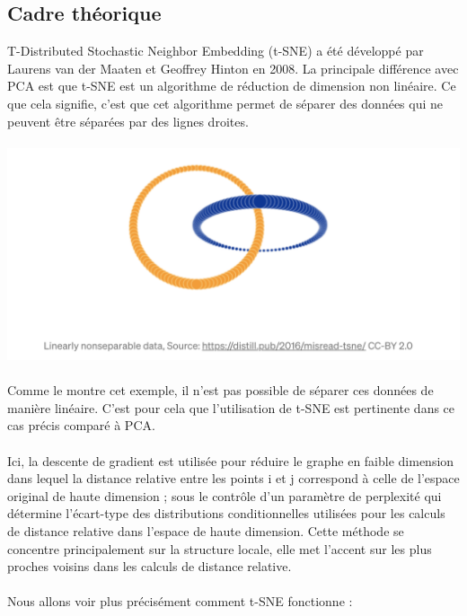         \subsection{Cadre théorique}
        T-Distributed Stochastic Neighbor Embedding (t-SNE) a été développé par Laurens van der Maaten et Geoffrey Hinton en 2008. La principale différence avec PCA est que t-SNE est un algorithme de réduction de dimension non linéaire. Ce que cela signifie, c'est que cet algorithme permet de séparer des données qui ne peuvent être séparées par des lignes droites.
        \\
        \\
        \includegraphics[width=\linewidth]{./img/reduction_dim/t_sne/exemple_data}
        \\
        \\
        Comme le montre cet exemple, il n'est pas possible de séparer ces données de manière linéaire. C'est pour cela que l'utilisation de t-SNE est pertinente dans ce cas précis comparé à PCA.
        \\
        \\
        Ici, la descente de gradient est utilisée pour réduire le graphe en faible dimension dans lequel la distance relative entre les points i et j correspond à celle de l'espace original de haute dimension ; sous le contrôle d'un paramètre de perplexité qui détermine l'écart-type des distributions conditionnelles utilisées pour les calculs de distance relative dans l'espace de haute dimension. Cette méthode se concentre principalement sur la structure locale, elle met l'accent sur les plus proches voisins dans les calculs de distance relative.
        \\
        \\
        Nous allons voir plus précisément comment t-SNE fonctionne :



